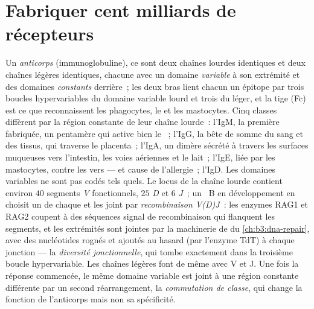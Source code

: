 \section{Fabriquer cent milliards de récepteurs}

\begin{definition}\label{def:b3:adaptive-immunity:antibody}
Un \emph{anticorps} (immunoglobuline), ce sont deux chaînes lourdes
identiques et deux chaînes légères identiques, chacune avec un domaine
\emph{variable} à son extrémité et des domaines \emph{constants}
derrière~; les deux bras lient chacun un épitope par trois boucles
hypervariables du domaine variable lourd et trois du léger, et la tige
(Fc) est ce que reconnaissent les phagocytes, le  et les
mastocytes. Cinq classes diffèrent par la région constante de leur
chaîne lourde~: l'IgM, la première fabriquée, un pentamère qui active
bien le ~; l'IgG, la bête de somme du sang et des tissus, qui
traverse le placenta~; l'IgA, un dimère sécrété à travers les surfaces
muqueuses vers l'intestin, les voies aériennes et le lait~; l'IgE, liée
par les mastocytes, contre les vers --- et cause de l'allergie~; l'IgD.
Les domaines variables ne sont pas codés tels quels. Le locus de la
chaîne lourde contient environ $40$ segments \emph{V} fonctionnels, $25$
\emph{D} et $6$ \emph{J}~; un ~B en développement en choisit
un de chaque et les joint par \emph{recombinaison V(D)J}~: les enzymes
RAG1 et RAG2 coupent à des séquences signal de recombinaison qui
flanquent les segments, et les extrémités sont jointes par la machinerie
de  du \cref{ch:b3:dna-repair}, avec
des nucléotides rognés et ajoutés au hasard (par l'enzyme TdT) à chaque
jonction --- la \emph{diversité jonctionnelle}, qui tombe exactement
dans la troisième boucle hypervariable. Les chaînes légères font de même
avec V et J. Une fois la réponse commencée, le même domaine variable est
joint à une région constante différente par un second réarrangement, la
\emph{commutation de classe}, qui change la fonction de l'anticorps mais
non sa spécificité.
\end{definition}

